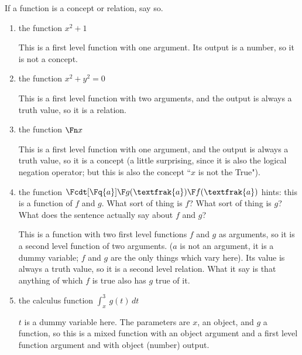 \documentclass[12pt]{article}
\begin{document}
\begin{enumerate}
If a function is a concept or relation, say so.

\begin{enumerate}

\item the function $x^2+1$

This is a first level function with one argument.  Its output is a number, so it is not a concept.

\item the function $x^2+y^2=0$

This is a first level function with two arguments, and the output is always a truth value, so it is a relation.

\item the function $\Fn x$

This is a first level function with one argument, and the output is always a truth value, so it is a concept (a little surprising, since it
is also the logical negation operator;  but this is also the concept ``$x$ is not the True").

\item the function $\Fcdt[\Fq{a}]{\F g(\textfrak{a})}{\F f(\textfrak{a})}$  hints:  this is a function of $f$ and $g$.  What sort of thing is $f$?  What sort of thing is $g$?
What does the sentence actually say about $f$ and $g$?

This is a function with two first level functions $f$ and $g$ as arguments, so it is a second level function of two arguments.  ($a$ is not an argument, it is a dummy variable;  $f$
and $g$ are the only things which vary here).  Its value is always a truth value, so it is a second level relation.  What it say is that anything of which $f$ is true also has
$g$ true of it.

\item the calculus function $\int_x^3\,g(t)\,dt$

$t$ is a dummy variable here.  The parameters are $x$, an object, and $g$ a function, so this is a mixed function with an object argument and a first level function argument and with object (number) output.

\end{enumerate}

\end{enumerate}
\end{document}
